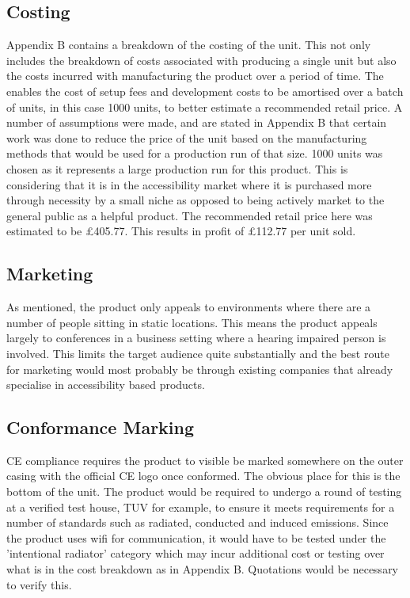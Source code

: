 \documentclass[a4paper]{article}
\begin{document}
\subsection{Costing}
Appendix B contains a breakdown of the costing of the unit. This not only
includes the breakdown of costs associated with producing a single unit but also
the costs incurred with manufacturing the product over a period of time. The
enables the cost of setup fees and development costs to be amortised over a
batch of units, in this case 1000 units, to better estimate a recommended retail
price. A number of assumptions were made, and are stated in Appendix B that
certain work was done to reduce the price of the unit based on the manufacturing
methods that would be used for a production run of that size.  1000 units was
chosen as it represents a large production run for this product. This is
considering that it is in the accessibility market where it is purchased more
through necessity by a small niche as opposed to being actively market to the
general public as a helpful product.  The recommended retail price here was
estimated to be £405.77. This results in profit of £112.77 per unit sold.

\subsection{Marketing}
As mentioned, the product only appeals to environments where there are a number
of people sitting in static locations. This means the product appeals largely to
conferences in a business setting where a hearing impaired person is involved.
This limits the target audience quite substantially and the best route for
marketing would most probably be through existing companies that already
specialise in accessibility based products.

\subsection{Conformance Marking}
CE compliance requires the product to visible be marked somewhere on the outer
casing with the official CE logo once conformed. The obvious place for this is
the bottom of the unit. The product would be required to undergo a round of
testing at a verified test house, TUV for example, to ensure it meets
requirements for a number of standards such as radiated, conducted and induced
emissions. Since the product uses wifi for communication, it would have to be
tested under the 'intentional radiator' category which may incur additional cost
or testing over what is in the cost breakdown as in Appendix B. Quotations
would be necessary to verify this.
\end{document}

